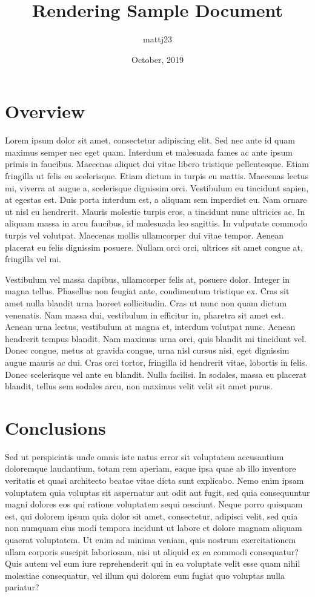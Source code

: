 \documentclass{article}
\title{Rendering Sample Document}
\author{mattj23}
\date{October, 2019}
\begin{document}
\maketitle

\section{Overview}
    Lorem ipsum dolor sit amet, consectetur adipiscing elit. Sed nec ante id quam maximus semper nec eget quam. Interdum et malesuada fames ac ante ipsum primis in faucibus. Maecenas aliquet dui vitae libero tristique pellentesque. Etiam fringilla ut felis eu scelerisque. Etiam dictum in turpis eu mattis. Maecenas lectus mi, viverra at augue a, scelerisque dignissim orci. Vestibulum eu tincidunt sapien, at egestas est. Duis porta interdum est, a aliquam sem imperdiet eu. Nam ornare ut nisl eu hendrerit. Mauris molestie turpis eros, a tincidunt nunc ultricies ac. In aliquam massa in arcu faucibus, id malesuada leo sagittis. In vulputate commodo turpis vel volutpat. Maecenas mollis ullamcorper dui vitae tempor. Aenean placerat eu felis dignissim posuere. Nullam orci orci, ultrices sit amet congue at, fringilla vel mi.

    Vestibulum vel massa dapibus, ullamcorper felis at, posuere dolor. Integer in magna tellus. Phasellus non feugiat ante, condimentum tristique ex. Cras sit amet nulla blandit urna laoreet sollicitudin. Cras ut nunc non quam dictum venenatis. Nam massa dui, vestibulum in efficitur in, pharetra sit amet est. Aenean urna lectus, vestibulum at magna et, interdum volutpat nunc. Aenean hendrerit tempus blandit. Nam maximus urna orci, quis blandit mi tincidunt vel. Donec congue, metus at gravida congue, urna nisl cursus nisi, eget dignissim augue mauris ac dui. Cras orci tortor, fringilla id hendrerit vitae, lobortis in felis. Donec scelerisque vel ante eu blandit. Nulla facilisi. In sodales, massa eu placerat blandit, tellus sem sodales arcu, non maximus velit velit sit amet purus.

\section{Conclusions}
    Sed ut perspiciatis unde omnis iste natus error sit voluptatem accusantium doloremque laudantium, totam rem aperiam, eaque ipsa quae ab illo inventore veritatis et quasi architecto beatae vitae dicta sunt explicabo. Nemo enim ipsam voluptatem quia voluptas sit aspernatur aut odit aut fugit, sed quia consequuntur magni dolores eos qui ratione voluptatem sequi nesciunt. Neque porro quisquam est, qui dolorem ipsum quia dolor sit amet, consectetur, adipisci velit, sed quia non numquam eius modi tempora incidunt ut labore et dolore magnam aliquam quaerat voluptatem. Ut enim ad minima veniam, quis nostrum exercitationem ullam corporis suscipit laboriosam, nisi ut aliquid ex ea commodi consequatur? Quis autem vel eum iure reprehenderit qui in ea voluptate velit esse quam nihil molestiae consequatur, vel illum qui dolorem eum fugiat quo voluptas nulla pariatur?
\end{document}
